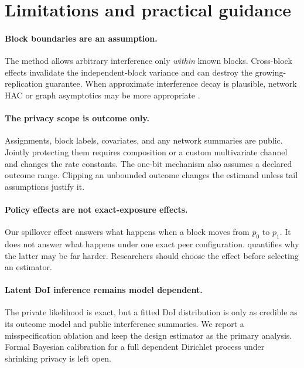 \documentclass[11pt]{article}
\theoremstyle{definition}
\theoremstyle{remark}
\begin{document}
\FloatBarrier

\section{Limitations and practical guidance}
\label{sec:limitations}

\paragraph{Block boundaries are an assumption.}
The method allows arbitrary interference only \emph{within} known blocks. Cross-block effects
invalidate the independent-block variance and can destroy the growing-replication guarantee.
When approximate interference decay is plausible, network HAC or graph asymptotics may be more
appropriate \citep{Leung2020,Leung2022}.

\paragraph{The privacy scope is outcome only.}
Assignments, block labels, covariates, and any network summaries are public. Jointly protecting
them requires composition or a custom multivariate channel and changes the rate constants.
The one-bit mechanism also assumes a declared outcome range. Clipping an unbounded outcome
changes the estimand unless tail assumptions justify it.

\paragraph{Policy effects are not exact-exposure effects.}
Our spillover effect answers what happens when a block moves from $p_0$ to $p_1$. It does not
answer what happens under one exact peer configuration.  quantifies why the
latter may be far harder. Researchers should choose the effect before selecting an estimator.

\paragraph{Latent DoI inference remains model dependent.}
The private likelihood is exact, but a fitted DoI distribution is only as credible as its
outcome model and public interference summaries. We report a misspecification ablation and keep
the design estimator as the primary analysis. Formal Bayesian calibration for a full dependent
Dirichlet process under shrinking privacy is left open.
\end{document}
